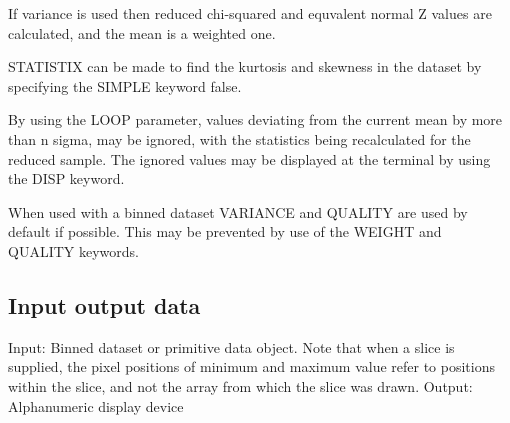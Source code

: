 \documentclass{book}
\renewcommand{\_}{{\tt\char'137}}     %
\begin{document}
If variance is used then reduced chi-squared and equvalent normal
Z values are calculated, and the mean is a weighted one.

STATISTIX can be made to find the kurtosis and skewness in the
dataset by specifying the SIMPLE keyword false.

By using the LOOP parameter, values deviating from the current
mean by more than n sigma, may be ignored, with the statistics
being recalculated for the reduced sample. The ignored values
may be displayed at the terminal by using the DISP keyword.

When used with a binned dataset VARIANCE and QUALITY are used by
default if possible. This may be prevented by use of the WEIGHT
and QUALITY keywords.

\subsection{Input output data}
Input: Binned dataset or primitive data object. Note that when a
slice is supplied, the pixel positions of minimum and
maximum value refer to positions within the slice, and not
the array from which the slice was drawn.
Output: Alphanumeric display device
\end{document}
